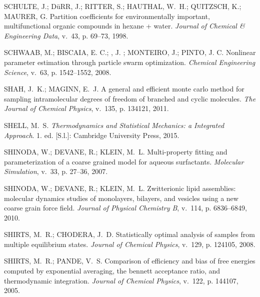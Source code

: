 \documentclass[
	12pt,				%
	openany,			%
	oneside,			%
	a4paper,			%
	english,			%
	brazil				%
	]{abntex2}
\begin{document}
\begin{thebibliography}{}
{SCHULTE, J.; DüRR, J.; RITTER, S.; HAUTHAL, W.~H.; QUITZSCH, K.; MAURER, G.
  Partition coefficients for environmentally important, multifunctional organic
  compounds in hexane + water.
\emph{Journal of Chemical \& Engineering Data}, v.~43, p. 69--73, 1998.}

{SCHWAAB, M.; BISCAIA, E. C.; , J. ; MONTEIRO, J.; PINTO, J. C. Nonlinear
  parameter estimation through particle swarm optimization.
\emph{Chemical Engineering Science}, v.~63, p. 1542--1552, 2008.}

{SHAH, J.~K.; MAGINN, E.~J. A general and efficient monte carlo method for
  sampling intramolecular degrees of freedom of branched and cyclic molecules.
\emph{The Journal of Chemical Physics}, v.~135, p. 134121, 2011.}

{SHELL, M.~S. \emph{Thermodynamics and Statistical Mechanics: a Integrated
  Approach}. 1. ed. [S.l.]: Cambridge University Press, 2015.}

{SHINODA, W.; DEVANE, R.; KLEIN, M.~L. Multi-property fitting and
  parameterization of a coarse grained model for aqueous surfactants.
\emph{Molecular Simulation}, v.~33, p. 27–36, 2007.}

{SHINODA, W.; DEVANE, R.; KLEIN, M.~L. Zwitterionic lipid assemblies: molecular
  dynamics studies of monolayers, bilayers, and vesicles using a new coarse
  grain force field.
\emph{Journal of Physical Chemistry B}, v.~114, p. 6836--6849, 2010.}

{SHIRTS, M.~R.; CHODERA, J.~D. Statistically optimal analysis of samples from
  multiple equilibrium states.
\emph{Journal of Chemical Physics}, v.~129, p. 124105, 2008.}

{SHIRTS, M.~R.; PANDE, V.~S. Comparison of efficiency and bias of free energies
  computed by exponential averaging, the bennett acceptance ratio, and
  thermodynamic integration.
\emph{Journal of Chemical Physics}, v.~122, p. 144107, 2005.}


\end{thebibliography}
\end{document}
